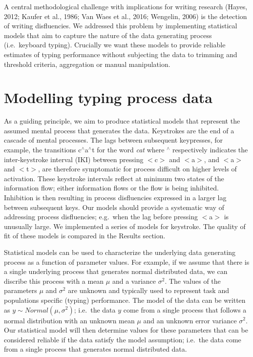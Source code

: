 \documentclass[
  english,
  man,mask,floatsintext]{apa7}
\begin{document}
A central methodological challenge with implications for writing research (Hayes, 2012; Kaufer et al., 1986; Van Waes et al., 2016; Wengelin, 2006) is the detection of writing disfluencies. We addressed this problem by implementing statistical models that aim to capture the nature of the data generating process (i.e.~keyboard typing). Crucially we want these models to provide reliable estimates of typing performance without subjecting the data to trimming and threshold criteria, aggregation or manual manipulation.

\hypertarget{modelling-typing-process-data}{%
\section{Modelling typing process data}\label{modelling-typing-process-data}}

As a guiding principle, we aim to produce statistical models that represent the assumed mental process that generates the data. Keystrokes are the end of a cascade of mental processes. The lags between subsequent keypresses, for example, the transitions c\(^{\wedge}\)a\(^{\wedge}\)t for the word \emph{cat} where \(^{\wedge}\) respectively indicates the inter-keystroke interval (IKI) between pressing \(<\)c\(>\) and \(<\)a\(>\), and \(<\)a\(>\) and \(<\)t\(>\), are therefore symptomatic for process difficult on higher levels of activation. These keystroke intervals reflect at minimum two states of the information flow; either information flows or the flow is being inhibited. Inhibition is then resulting in process disfluencies expressed in a larger lag between subsequent keys. Our models should provide a systematic way of addressing process disfluencies; e.g.~when the lag before pressing \(<\)a\(>\) is unusually large. We implemented a series of models for keystroke. The quality of fit of these models is compared in the Results section.

Statistical models can be used to characterize the underlying data generating process as a function of parameter values. For example, if we assume that there is a single underlying process that generates normal distributed data, we can discribe this process with a mean \(\mu\) and a variance \(\sigma^2\). The values of the parameters \(\mu\) and \(\sigma^2\) are unknown and typically used to represent task and populations specific (typing) performance. The model of the data can be written as \(y \sim Normal(\mu, \sigma^2)\); i.e.~the data \(y\) come from a single process that follows a normal distribution with an unknown mean \(\mu\) and an unknown error variance \(\sigma^2\). Our statistical model will then determine values for these parameters that can be considered reliable if the data satisfy the model assumption; i.e.~the data come from a single process that generates normal distributed data.
\end{document}
